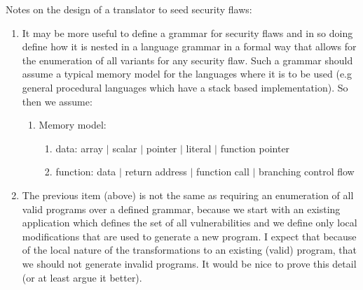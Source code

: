 Notes on the design of a translator to seed security flaws:
\begin{enumerate}

   \item It may be more useful to define a grammar for security flaws and
in so doing define how it is nested in a language grammar in a formal
way that allows for the enumeration of all variants for any security flaw.
Such a grammar should assume a typical memory model for the languages
where it is to be used (e.g general procedural languages which have a
stack based implementation).  So then we assume:
      \begin{enumerate}
         \item Memory model:
            \begin{enumerate}
               \item data: array $|$ scalar $|$ pointer $|$ literal $|$ function pointer
               \item function: data $|$ return address $|$ function call $|$ branching control flow
            \end{enumerate}
      \end{enumerate}

   \item The previous item (above) is not the same as requiring an enumeration of all
         valid  programs over
         a defined grammar, because we start with an existing application which defines
         the set of all vulnerabilities and we define only local modifications that
         are used to generate a new program.  I expect that because of the local nature
         of the transformations to an existing (valid) program, that we should not
         generate invalid programs.  It would be nice to prove this detail (or 
         at least argue it better).


\end{enumerate}

